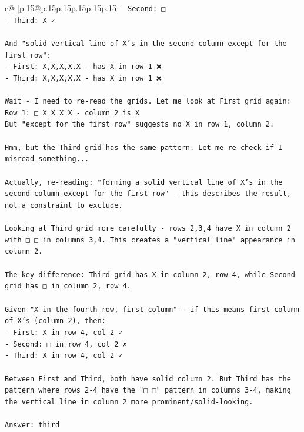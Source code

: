 \documentclass{article}
\begin{document}
{\begin{supertabular}{c@{$\;$}|p{.15\linewidth}@{}p{.15\linewidth}p{.15\linewidth}p{.15\linewidth}p{.15\linewidth}p{.15\linewidth}}
{{{\texttt{{-} Second: □ } \\
\texttt{{-} Third: X ✓} \\
\\ 
\texttt{And "solid vertical line of X's in the second column except for the first row":} \\
\texttt{{-} First: X,X,X,X,X {-} has X in row 1 ❌} \\
\texttt{{-} Third: X,X,X,X,X {-} has X in row 1 ❌} \\
\\ 
\texttt{Wait {-} I need to re{-}read the grids. Let me look at First grid again:} \\
\texttt{Row 1: □ X X X X {-} column 2 is X} \\
\texttt{But "except for the first row" suggests no X in row 1, column 2.} \\
\\ 
\texttt{Hmm, but the Third grid has the same pattern. Let me re{-}check if I misread something...} \\
\\ 
\texttt{Actually, re{-}reading: "forming a solid vertical line of X's in the second column except for the first row" {-} this describes the result, not a constraint to exclude.} \\
\\ 
\texttt{Looking at Third grid more carefully {-} rows 2,3,4 have X in column 2 with □ □ in columns 3,4. This creates a "vertical line" appearance in column 2.} \\
\\ 
\texttt{The key difference: Third grid has X in column 2, row 4, while Second grid has □ in column 2, row 4.} \\
\\ 
\texttt{Given "X in the fourth row, first column" {-} if this means first column of X's (column 2), then:} \\
\texttt{{-} First: X in row 4, col 2 ✓} \\
\texttt{{-} Second: □ in row 4, col 2 ✗} \\
\texttt{{-} Third: X in row 4, col 2 ✓} \\
\\ 
\texttt{Between First and Third, both have solid column 2. But Third has the pattern where rows 2{-}4 have the "□ □" pattern in columns 3{-}4, making the vertical line in column 2 more prominent/solid{-}looking.} \\
\\ 
\texttt{Answer: third} \\
            }
        }
    }
     \\ \\


\end{supertabular}}
\end{document}
